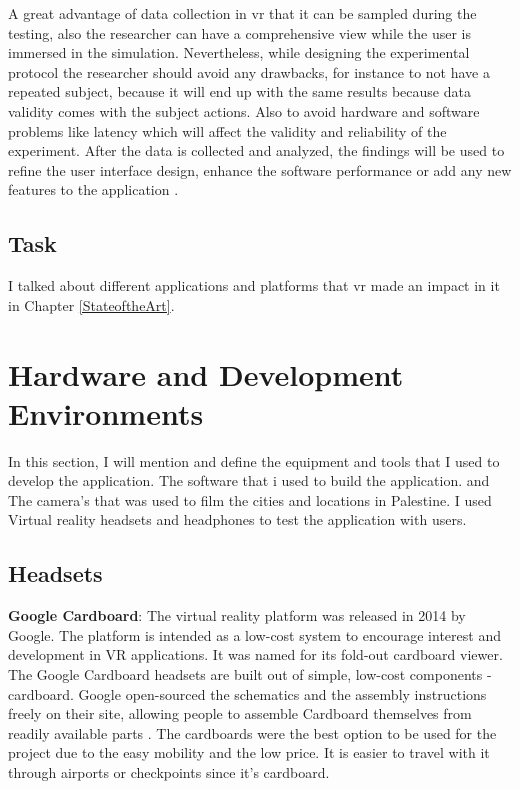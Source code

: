 A great advantage of data collection in \acrlong{vr} that it can be sampled during the testing, also the researcher can have a comprehensive view while the user is immersed in the simulation. Nevertheless, while designing the experimental protocol the researcher should avoid any drawbacks, for instance to not have a repeated subject, because it will end up with the same results because data validity comes with the subject actions. Also to avoid hardware and software problems like latency which will affect the validity and reliability of the experiment. After the data is collected and analyzed, the findings will be used to refine the user interface design, enhance the software performance or add any new features to the application \citep{burdea2017virtual}. 
 
\subsection{Task}

I talked about different applications and platforms that \acrshort{vr} made an impact in it in Chapter \ref{StateoftheArt}.  


\section{Hardware and Development Environments}

In this section, I will mention and define the equipment and tools that I used to develop the application. The software that i used to build the application. and The camera's that was used to film the cities and locations in Palestine. I used Virtual reality headsets and headphones to test the application with users.


\subsection{Headsets}

\textbf{Google Cardboard}: The virtual reality platform was released in
2014 by Google. The platform is intended as a low-cost system to
encourage interest and development in VR applications. It was
named for its fold-out cardboard viewer. The Google Cardboard
headsets are built out of simple, low-cost components -
cardboard. Google open-sourced the schematics and the
assembly instructions freely on their site, allowing people to
assemble Cardboard themselves from readily available parts \citep{Prasuethsut2014GoogleReview}. The cardboards were the best option to be used for the project due to the easy mobility and the low price. It is easier to travel with it through airports or checkpoints since it’s cardboard.




